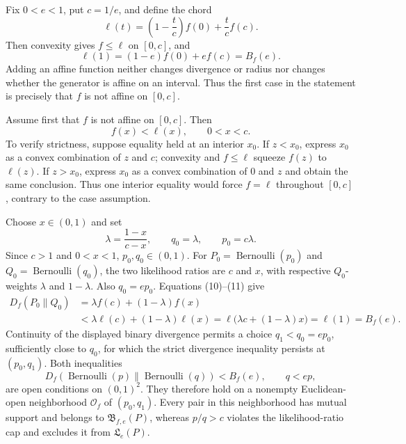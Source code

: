 Fix \(0<e<1\), put \(c=1/e\), and define the chord
\[
 \ell(t)=\left(1-\frac tc\right)f(0)+\frac tc f(c).
\]
Then convexity gives \(f\le\ell\) on \([0,c]\), and
\[
 \ell(1)=(1-e)f(0)+ef(c)=B_f(e). \tag{10}
\]
Adding an affine function neither changes divergence or radius nor changes whether the generator is affine on an interval.  Thus the first case in the statement is precisely that \(f\) is not affine on \([0,c]\).

Assume first that \(f\) is not affine on \([0,c]\).  Then
\[
 f(x)<\ell(x),\qquad 0<x<c. \tag{11}
\]
To verify strictness, suppose equality held at an interior \(x_0\).  If \(z<x_0\), express \(x_0\) as a convex combination of \(z\) and \(c\); convexity and \(f\le\ell\) squeeze \(f(z)\) to \(\ell(z)\).  If \(z>x_0\), express \(x_0\) as a convex combination of \(0\) and \(z\) and obtain the same conclusion.  Thus one interior equality would force \(f=\ell\) throughout \([0,c]\), contrary to the case assumption.

Choose \(x\in(0,1)\) and set
\[
 \lambda=\frac{1-x}{c-x},\qquad q_0=\lambda,\qquad p_0=c\lambda.
\]
Since \(c>1\) and \(0<x<1\), \(p_0,q_0\in(0,1)\).  For \(P_0=\operatorname{Bernoulli}(p_0)\) and \(Q_0=\operatorname{Bernoulli}(q_0)\), the two likelihood ratios are \(c\) and \(x\), with respective \(Q_0\)-weights \(\lambda\) and \(1-\lambda\).  Also \(q_0=ep_0\).  Equations (10)--(11) give
\[
 \begin{aligned}
 D_f(P_0\|Q_0)
 &=\lambda f(c)+(1-\lambda)f(x)\\
 &<\lambda\ell(c)+(1-\lambda)\ell(x)
 =\ell\bigl(\lambda c+(1-\lambda)x\bigr)
 =\ell(1)=B_f(e).
 \end{aligned} \tag{12}
\]
Continuity of the displayed binary divergence permits a choice \(q_1<q_0=ep_0\), sufficiently close to \(q_0\), for which the strict divergence inequality persists at \((p_0,q_1)\).  Both inequalities
\[
 D_f(\operatorname{Bernoulli}(p)\|\operatorname{Bernoulli}(q))<B_f(e),
 \qquad q<ep,
\]
are open conditions on \((0,1)^2\).  They therefore hold on a nonempty Euclidean-open neighborhood \(\mathcal O_f\) of \((p_0,q_1)\).  Every pair in this neighborhood has mutual support and belongs to \(\mathfrak B_{f,e}(P)\), whereas \(p/q>c\) violates the likelihood-ratio cap and excludes it from \(\mathfrak L_e(P)\).

